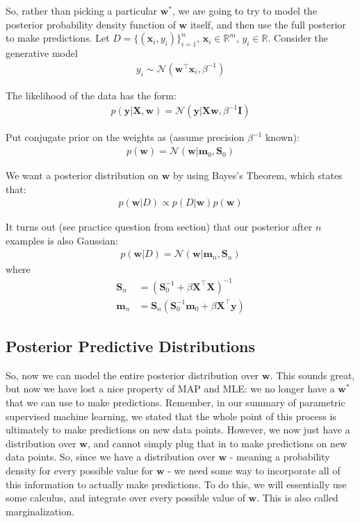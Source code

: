 \documentclass[12pt,letterpaper]{article}
\newcommand{\1}{\mathbbm{1}}
\begin{document}
\noindent 
So, rather than picking a particular $\mathbf{w}^*$, we are going to try to model the posterior probability density function of $\mathbf{w}$ itself, and then use the full posterior to make predictions. Let $D = \{(\mathbf{x}_i, y_i)\}_{i=1}^n$, $\mathbf{x}_i \in \mathbb{R}^m$, $y_i \in \mathbb{R}$. Consider the generative model
\begin{align}
y_i \sim \mathcal{N}(\mathbf{w}^\top \mathbf{x}_i, \beta^{-1})
\end{align}

\noindent The likelihood of the data has the form:
\begin{align}
    p(\mathbf{y}|\mathbf{X},\mathbf{w}) = \mathcal{N}(\mathbf{y}|\mathbf{X}\mathbf{w},\beta^{-1}\mathbf{I})
\end{align}

\noindent Put conjugate prior on the weights as (assume precision $\beta^{-1}$ known):
\begin{align}
    p(\mathbf{w}) = \mathcal{N}(\mathbf{w}|\mathbf{m}_0, \mathbf{S}_0)
\end{align}

\noindent We want a posterior distribution on $\mathbf{w}$ by using Bayes's Theorem, which states that:
\begin{align}
    p(\mathbf{w}|D) \propto p(D|\mathbf{w})p(\mathbf{w})
\end{align}

\noindent It turns out (see practice question from section) that our posterior after $n$ examples is also Gaussian:
\begin{align}
    p(\mathbf{w} | D)=\mathcal{N}(\mathbf{w}|\mathbf{m}_n, \mathbf{S}_n)
\end{align}
\noindent where
\begin{align}
\mathbf{S}_n &= \left(\mathbf{S}_0^{-1} + \beta \mathbf{X}^\top\mathbf{X}\right)^{-1}\\
\mathbf{m}_n &= \mathbf{S}_n(\mathbf{S}_0^{-1}\mathbf{m}_0 + \beta \mathbf{X}^\top\mathbf{y})
\end{align}


\subsection{Posterior Predictive Distributions}

So, now we can model the entire posterior distribution over $\mathbf{w}$. This sounds great, but now we have lost a nice property of MAP and MLE: we no longer have a $\mathbf{w}^*$ that we can use to make predictions. Remember, in our summary of parametric supervised machine learning, we stated that the whole point of this process is ultimately to make predictions on new data points. However, we now just have a distribution over $\mathbf{w}$, and cannot simply plug that in to make predictions on new data points. So, since we have a distribution over $\mathbf{w}$ - meaning a probability density for every possible value for $\mathbf{w}$ - we need some way to incorporate all of this information to actually make predictions. To do this, we will essentially use some calculus, and integrate over every possible value of $\mathbf{w}$. This is also called marginalization.\\
\end{document}
